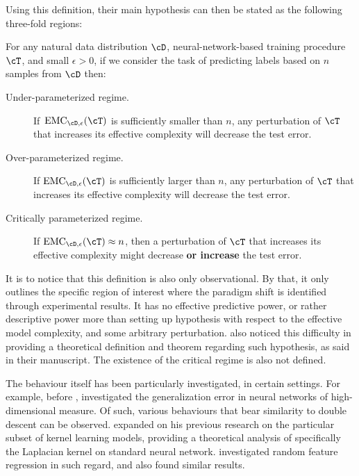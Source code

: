 \documentclass[
  journal=largetwo,
  year=2025,
  volume=37,
]{cup-journal}
\begin{document}
Using this definition, their main hypothesis can then be stated as the following three-fold regions:

\begin{hypothesis} \label{hyp:informaldd}
For any natural data distribution $\cD$, neural-network-based training procedure $\cT$, and small $\epsilon>0$,
if we consider the task of predicting labels based on  $n$ samples from $\cD$ then:
\begin{description}
    \item[Under-parameterized regime.]  If~$\EMC_{\cD,\epsilon}(\cT)$ is sufficiently smaller than $n$, any perturbation of $\cT$ that increases its effective complexity will decrease the test error.
    \item[Over-parameterized regime.] If $\EMC_{\cD,\epsilon}(\cT)$ is sufficiently larger than $n$,
    any perturbation of $\cT$ that increases its effective complexity will decrease the test error.
    
    \item[Critically parameterized regime.] If $\EMC_{\cD,\epsilon}(\cT) \approx n$, then
    a perturbation of $\cT$ that increases its effective complexity
    might decrease {\bf or increase} the test error.
\end{description}
\end{hypothesis}

It is to notice that this definition is also only observational. By that, it only outlines the specific region of interest where the paradigm shift is identified through experimental results. It has no effective predictive power, or rather descriptive power more than setting up hypothesis with respect to the effective model complexity, and some arbitrary perturbation. \cite{nakkiran_deep_2019} also noticed this difficulty in providing a theoretical definition and theorem regarding such hypothesis, as said in their manuscript. The existence of the critical regime is also not defined. 

The behaviour itself has been particularly investigated, in certain settings. For example, before \cite{belkin_reconciling_2019}, \cite{advani2017highdimensionaldynamicsgeneralizationerror} investigated the generalization error in neural networks of high-dimensional measure. Of such, various behaviours that bear similarity to double descent can be observed. \cite{belkin2018understanddeeplearningneed} expanded on his previous research on the particular subset of kernel learning models, providing a theoretical analysis of specifically the Laplacian kernel on standard neural network. \cite{mei2020generalizationerrorrandomfeatures} investigated random feature regression in such regard, and also found similar results. 
\end{document}
